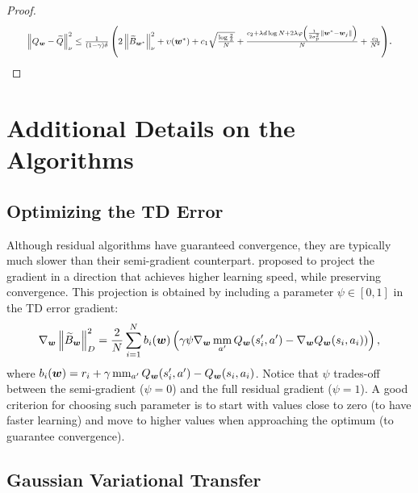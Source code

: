 \documentclass{article}
\newcommand{\mm}{\operatornamewithlimits{mm}}
\newcommand{\wt}[1]{\widetilde{#1}}
\newcommand{\norm}[1]{\left\lVert #1 \right\rVert}
\begin{document}
\begin{proof}
\begin{align*}
\resizebox{0.93\textwidth}{!}{$
\norm{Q_{\bm{w}} - \wt{Q}}_{\nu}^2 \leq \frac{1}{(1-\gamma)\delta}\left(2\norm{\wt{B}_{\bm{w}^{*}}}_{\nu}^2 + \upsilon(\bm{w}^*) + c_1\sqrt{\frac{\log\frac{2}{\delta}}{N}}  + \frac{c_2 + \lambda d \log N + 2\lambda\varphi\left(\frac{1}{2\sigma^2_p}\norm{\bm{w}^* - \bm{w}_j}\right)}{N} + \frac{c_3}{N^2}\right)$}.
\end{align*}
\end{proof}

\section{Additional Details on the Algorithms}

\subsection{Optimizing the TD Error}

Although residual algorithms have guaranteed convergence, they are typically much slower than their semi-gradient counterpart. \cite{baird1995residual} proposed to project the gradient in a direction that achieves higher learning speed, while preserving convergence. This projection is obtained by including a parameter $\psi\in[0,1]$ in the TD error gradient:
\begin{equation}
\nabla_{\bm{w}}\norm{\wt{B}_{\bm{w}}}_{D}^2 = \frac{2}{N}\sum_{i=1}^N b_i(\bm{w})\left( \gamma\psi\nabla_{\bm{w}}\mm_{a'}Q_{\bm{w}}(s_i',a') - \nabla_{\bm{w}}Q_{\bm{w}}(s_i,a_i)) \right),
\end{equation}
where $b_i(\bm{w}) = r_i + \gamma\mm_{a'}Q_{\bm{w}}(s_i',a') - Q_{\bm{w}}(s_i,a_i)$. Notice that $\psi$ trades-off between the semi-gradient ($\psi = 0$) and the full residual gradient ($\psi = 1$). A good criterion for choosing such parameter is to start with values close to zero (to have faster learning) and move to higher values when approaching the optimum (to guarantee convergence).

\subsection{Gaussian Variational Transfer}
\end{document}
